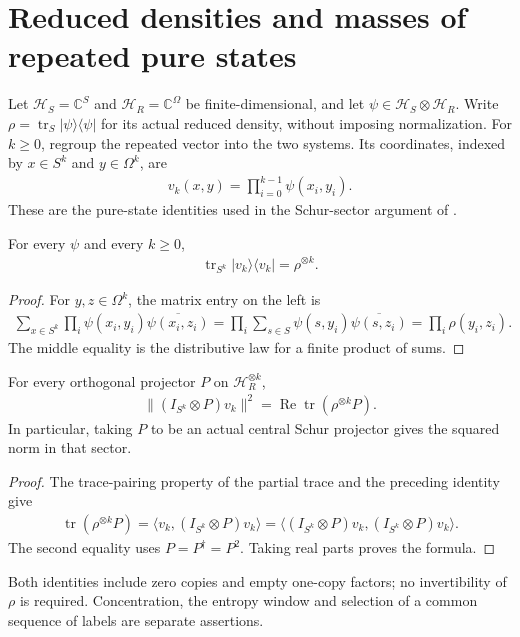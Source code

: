 \section{Reduced densities and masses of repeated pure states}
\label{sec:pure_tensor_power}

Let $\mathcal H_S=\mathbb C^S$ and $\mathcal H_R=\mathbb C^\Omega$ be
finite-dimensional, and let $\psi\in\mathcal H_S\otimes\mathcal H_R$.
Write $\rho=\operatorname{tr}_S|\psi\rangle\langle\psi|$ for its actual
reduced density, without imposing normalization.
For $k\ge0$, regroup the repeated vector into the two systems. Its coordinates,
indexed by $x\in S^k$ and $y\in\Omega^k$, are
\begin{align}
 v_k(x,y)=\prod_{i=0}^{k-1}\psi(x_i,y_i).
\end{align}
These are the pure-state identities used in the Schur-sector argument of
\cite[Section~7]{OpenAI2026AreaLaw}.

\begin{theorem}
\label{thm:pure_tensor_power_marginal}
\leanok
For every $\psi$ and every $k\ge0$,
\begin{align}
 \operatorname{tr}_{S^k}|v_k\rangle\langle v_k|=\rho^{\otimes k}.
\end{align}
\end{theorem}
\begin{proof}
\leanok
For $y,z\in\Omega^k$, the matrix entry on the left is
\begin{align}
 \sum_{x\in S^k}\prod_i\psi(x_i,y_i)\overline{\psi(x_i,z_i)}
 =\prod_i\sum_{s\in S}\psi(s,y_i)\overline{\psi(s,z_i)}
 =\prod_i\rho(y_i,z_i).
\end{align}
The middle equality is the distributive law for a finite product of sums.
\end{proof}

\begin{theorem}
\label{thm:pure_tensor_power_projection_mass}
\leanok
{}
For every orthogonal projector $P$ on $\mathcal H_R^{\otimes k}$,
\begin{align}
 \|(I_{S^k}\otimes P)v_k\|^2
 =\operatorname{Re}\operatorname{tr}(\rho^{\otimes k}P).
\end{align}
In particular, taking $P$ to be an actual central Schur projector gives
the squared norm in that sector.
\end{theorem}
\begin{proof}
\leanok
{}
The trace-pairing property of the partial trace and the preceding identity
give
\begin{align}
 \operatorname{tr}(\rho^{\otimes k}P)
 =\langle v_k,(I_{S^k}\otimes P)v_k\rangle
 =\langle (I_{S^k}\otimes P)v_k,(I_{S^k}\otimes P)v_k\rangle.
\end{align}
The second equality uses $P=P^\dagger=P^2$. Taking real parts proves the
formula.
\end{proof}

Both identities include zero copies and empty one-copy factors; no
invertibility of $\rho$ is required. Concentration, the entropy window and
selection of a common sequence of labels are separate assertions.
